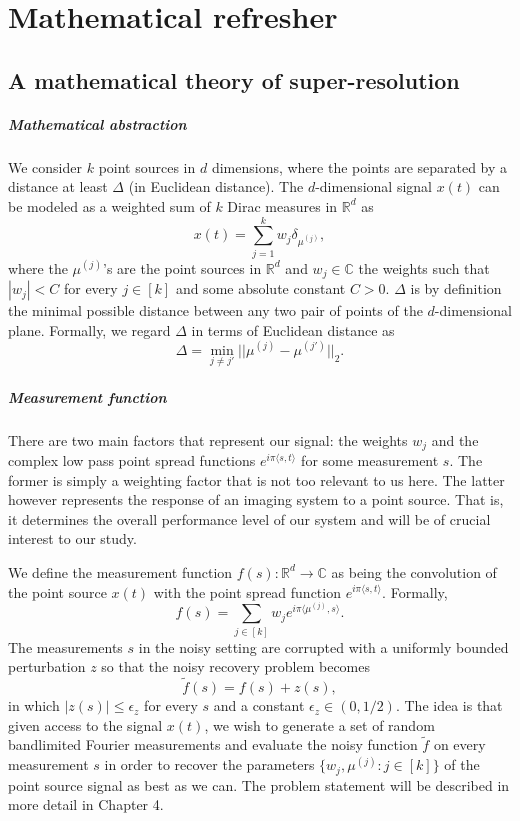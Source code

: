 \chapter{Mathematical refresher}
\section{A mathematical theory of super-resolution}
\paragraph{Mathematical abstraction} We consider $k$ point sources in $d$ dimensions, where the points are separated by a distance at least $\Delta$ (in Euclidean distance). The $d$-dimensional signal $x(t)$ can be modeled as a weighted sum of $k$ Dirac measures in $\mathbb{R}^d$ as $$x(t)=\sum_{j=1}^k w_j\delta_{\mu^{(j)}},$$ where the $\mu^{(j)}$'s are the point sources in $\mathbb{R}^d$ and $w_j\in\mathbb{C}$ the weights such that $|w_j|<C$ for every $j\in[k]$ and some absolute constant $C>0$. $\Delta$ is by definition the minimal possible distance between any two pair of points of the $d$-dimensional plane. Formally, we regard $\Delta$ in terms of Euclidean distance as $$\Delta=\min_{j\neq j'}||\mu^{(j)}-\mu^{(j')}||_2.$$
\paragraph{Measurement function} There are two main factors that represent our signal: the weights $w_j$ and the complex low pass point spread functions $e^{i\pi\langle s,t\rangle}$ for some measurement $s$. The former is simply a weighting factor that is not too relevant to us here. The latter however represents the response of an imaging system to a point source. That is, it determines the overall performance level of our system and will be of crucial interest to our study.\par 
We define the measurement function $f(s):\mathbb{R}^d\to\mathbb{C}$ as being the convolution of the point source $x(t)$ with the point spread function $e^{i\pi\langle s,t\rangle}$. Formally, $$f(s)=\sum_{j\in[k]}w_je^{i\pi\langle\mu^{(j)},s\rangle}.$$ The measurements $s$ in the noisy setting are corrupted with a uniformly bounded perturbation $z$ so that the noisy recovery problem becomes $$\tilde{f}(s)=f(s)+z(s),$$ in which $|z(s)|\leq\epsilon_z$ for every $s$ and a constant $\epsilon_z\in(0,1/2)$. The idea is that given access to the signal $x(t)$, we wish to generate a set of random bandlimited Fourier measurements and evaluate the noisy function $\tilde{f}$ on every measurement $s$ in order to recover the parameters $\{w_j,\mu^{(j)}:j\in[k]\}$ of the point source signal as best as we can. The problem statement will be described in more detail in Chapter 4.

